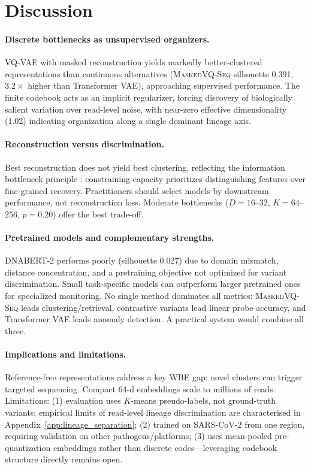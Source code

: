 \documentclass[pmlr]{jmlr}%
\newcommand{\ours}{\textsc{MaskedVQ-Seq}}
\begin{document}
\section{Discussion}
\label{sec:discussion}

\paragraph{Discrete bottlenecks as unsupervised organizers.}
VQ-VAE with masked reconstruction yields markedly better-clustered representations than continuous alternatives (\ours{} silhouette 0.391, $3.2\times$ higher than Transformer VAE), approaching supervised performance. The finite codebook acts as an implicit regularizer, forcing discovery of biologically salient variation over read-level noise, with near-zero effective dimensionality (1.02) indicating organization along a single dominant lineage axis.

\paragraph{Reconstruction versus discrimination.}
Best reconstruction does not yield best clustering, reflecting the information bottleneck principle \citep{tishby2000information}: constraining capacity prioritizes distinguishing features over fine-grained recovery. Practitioners should select models by downstream performance, not reconstruction loss. Moderate bottlenecks ($D=16$--$32$, $K=64$--$256$, $p=0.20$) offer the best trade-off.

\paragraph{Pretrained models and complementary strengths.}
DNABERT-2 performs poorly (silhouette 0.027) due to domain mismatch, distance concentration, and a pretraining objective not optimized for variant discrimination. Small task-specific models can outperform larger pretrained ones for specialized monitoring. No single method dominates all metrics: \ours{} leads clustering/retrieval, contrastive variants lead linear probe accuracy, and Transformer VAE leads anomaly detection. A practical system would combine all three.

\paragraph{Implications and limitations.}
Reference-free representations address a key WBE gap: novel clusters can trigger targeted sequencing. Compact 64-d embeddings scale to millions of reads. Limitations: (1) evaluation uses $K$-means pseudo-labels, not ground-truth variants; empirical limits of read-level lineage discrimination are characterised in Appendix~\ref{app:lineage_separation}; (2) trained on SARS-CoV-2 from one region, requiring validation on other pathogens/platforms; (3) uses mean-pooled pre-quantization embeddings rather than discrete codes---leveraging codebook structure directly remains open.
\end{document}
